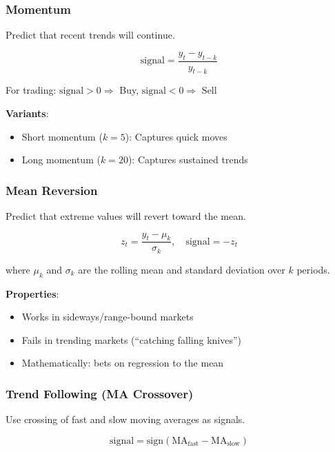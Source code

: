 \documentclass[11pt,a4paper]{article}
\theoremstyle{definition}
\theoremstyle{plain}
\begin{document}
\subsubsection{Momentum}

Predict that recent trends will continue.

\begin{equation}
\text{signal} = \frac{y_t - y_{t-k}}{y_{t-k}}
\end{equation}

For trading: $\text{signal} > 0 \Rightarrow$ Buy, $\text{signal} < 0 \Rightarrow$ Sell

\textbf{Variants}:
\begin{itemize}
    \item Short momentum ($k = 5$): Captures quick moves
    \item Long momentum ($k = 20$): Captures sustained trends
\end{itemize}

\subsubsection{Mean Reversion}

Predict that extreme values will revert toward the mean.

\begin{equation}
z_t = \frac{y_t - \mu_k}{\sigma_k}, \quad \text{signal} = -z_t
\end{equation}

where $\mu_k$ and $\sigma_k$ are the rolling mean and standard deviation over $k$ periods.

\textbf{Properties}:
\begin{itemize}
    \item Works in sideways/range-bound markets
    \item Fails in trending markets (``catching falling knives'')
    \item Mathematically: bets on regression to the mean
\end{itemize}

\subsubsection{Trend Following (MA Crossover)}

Use crossing of fast and slow moving averages as signals.

\begin{equation}
\text{signal} = \text{sign}(\text{MA}_{\text{fast}} - \text{MA}_{\text{slow}})
\end{equation}
\end{document}
